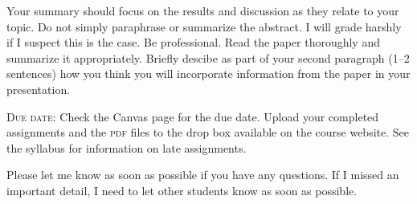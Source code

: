 \documentclass[12pt]{article}
\begin{document}
Your summary should focus on the results and discussion as they relate to your topic. Do not simply paraphrase or summarize the abstract. I will grade harshly if I suspect this is the case. Be professional. Read the paper thoroughly and summarize it appropriately. Briefly descibe as part of your second paragraph (1–2 sentences) how you think you will incorporate information from the paper in your presentation. %

\textsc{Due date:} Check the Canvas page for the due date. Upload your completed assignments and the \textsc{pdf} files to the drop box available on the course website. See the syllabus for information on late assignments.

\vspace*{\baselineskip}

Please let me know as soon as possible if you have any questions. If I missed an important detail, I need to let other students know as soon as possible.
\end{document}
